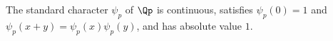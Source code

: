 The standard character $\psi_p$ of $\Qp$ is continuous, satisfies $\psi_p(0)=1$ and $\psi_p(x+y)=\psi_p(x)\psi_p(y)$, and has absolute value $1$.
